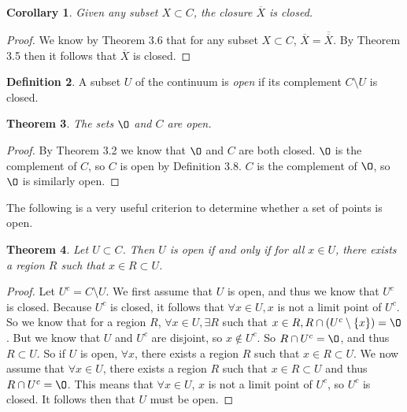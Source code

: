 \documentclass[12pt]{article}
\renewcommand{\emptyset}{\O}
\renewcommand{\_}[1]{\underline{ #1 }}
\newtheorem{theorem}{Theorem}[section]
\newtheorem{corollary}[theorem]{Corollary}
\theoremstyle{definition}
\newtheorem{definition}[theorem]{Definition}
\numberwithin{equation}{subsection}
\begin{document}
\begin{corollary}  Given any subset $X \subset C$, the closure $\overline{X}$ is closed.
\end{corollary}

\begin{proof}
We know by Theorem 3.6 that for any subset $X \subset C$, $\overline{X} = \overline{\overline{X}}$. By Theorem 3.5 then it follows that $\overline{X}$ is closed. 
\end{proof}

\begin{definition}  A subset $U$ of the continuum is \emph{open} if its complement $C \setminus U$ is closed.
\end{definition}

\begin{theorem}\label{fortop1}  The sets $\emptyset$ and $C$ are open.
\end{theorem}

\begin{proof}
By Theorem 3.2 we know that $\emptyset$ and $C$ are both closed. $\emptyset$ is the complement of $C$, so $C$ is open by Definition 3.8. $C$ is the complement of $\emptyset$, so $\emptyset$ is similarly open.
\end{proof}

The following is a very useful criterion to determine whether a set of points is open.

\begin{theorem}  Let $U \subset C$.  Then $U$ is open if and only if for all $x \in U$, there exists a region $R$ such that $x \in R \subset U$.
\end{theorem}

\begin{proof}
Let $U^c = C \setminus U$.
We first assume that $U$ is open, and thus we know that $U^c$ is closed. Because $U^c$ is closed, it follows that $\forall x \in U, x$ is not a limit point of $U^c$. So we know that for a region $R$, $\forall x \in U, \exists R$ such that $x \in R, R \cap (U^c \setminus \{x\})= \emptyset$. But we know that $U$ and $U^c$ are disjoint, so $x \not \in U^c$. So $R \cap U^c = \emptyset$, and thus $R \subset U$. So if $U$ is open, $\forall x$, there exists a region $R$ such that $x \in R \subset U$. 
We now assume that $\forall x \in U$, there exists a region $R$ such that $x \in R \subset U$ and thus $R \cap U^c = \emptyset$. This means that $\forall x \in U$, $x$ is not a limit point of $U^c$, so $U^c$ is closed. It follows then that $U$ must be open. 
\end{proof}
\end{document}
